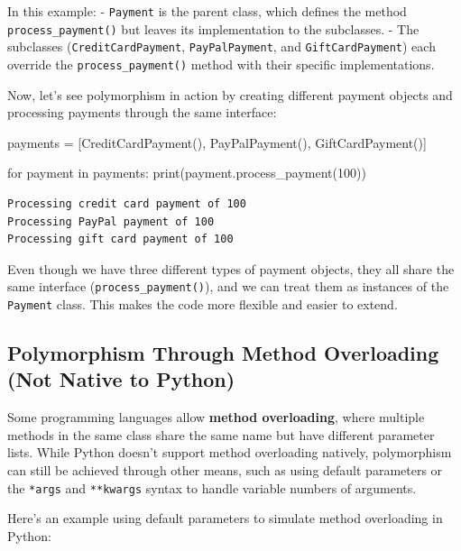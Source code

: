 \documentclass[
  letterpaper,
  DIV=11,
  numbers=noendperiod]{scrreprt}
\newenvironment{Shaded}{\begin{snugshade}}{\end{snugshade}}
\newcommand{\BuiltInTok}[1]{\textcolor[rgb]{0.00,0.23,0.31}{#1}}
\newcommand{\ControlFlowTok}[1]{\textcolor[rgb]{0.00,0.23,0.31}{#1}}
\newcommand{\DecValTok}[1]{\textcolor[rgb]{0.68,0.00,0.00}{#1}}
\newcommand{\KeywordTok}[1]{\textcolor[rgb]{0.00,0.23,0.31}{#1}}
\newcommand{\NormalTok}[1]{\textcolor[rgb]{0.00,0.23,0.31}{#1}}
\newcommand{\OperatorTok}[1]{\textcolor[rgb]{0.37,0.37,0.37}{#1}}
\begin{document}
In this example: - \texttt{Payment} is the parent class, which defines
the method \texttt{process\_payment()} but leaves its implementation to
the subclasses. - The subclasses (\texttt{CreditCardPayment},
\texttt{PayPalPayment}, and \texttt{GiftCardPayment}) each override the
\texttt{process\_payment()} method with their specific implementations.

Now, let's see polymorphism in action by creating different payment
objects and processing payments through the same interface:

\begin{Shaded}
\begin{Highlighting}[]
\NormalTok{payments }\OperatorTok{=}\NormalTok{ [CreditCardPayment(), PayPalPayment(), GiftCardPayment()]}

\ControlFlowTok{for}\NormalTok{ payment }\KeywordTok{in}\NormalTok{ payments:}
    \BuiltInTok{print}\NormalTok{(payment.process\_payment(}\DecValTok{100}\NormalTok{))}
\end{Highlighting}
\end{Shaded}

\begin{verbatim}
Processing credit card payment of 100
Processing PayPal payment of 100
Processing gift card payment of 100
\end{verbatim}

Even though we have three different types of payment objects, they all
share the same interface (\texttt{process\_payment()}), and we can treat
them as instances of the \texttt{Payment} class. This makes the code
more flexible and easier to extend.

\hypertarget{polymorphism-through-method-overloading-not-native-to-python}{%
\subsection{Polymorphism Through Method Overloading (Not Native to
Python)}\label{polymorphism-through-method-overloading-not-native-to-python}}

Some programming languages allow \textbf{method overloading}, where
multiple methods in the same class share the same name but have
different parameter lists. While Python doesn't support method
overloading natively, polymorphism can still be achieved through other
means, such as using default parameters or the \texttt{*args} and
\texttt{**kwargs} syntax to handle variable numbers of arguments.

Here's an example using default parameters to simulate method
overloading in Python:
\end{document}
